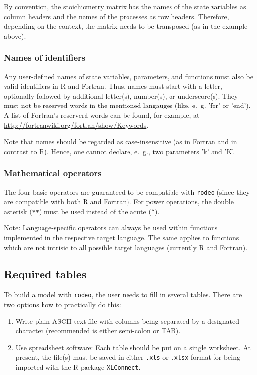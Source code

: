 \documentclass[a4paper]{article}
\newcommand{\rodeo}{\texttt{rodeo}}
\begin{document}
\bigskip
By convention, the stoichiometry matrix has the names of the state variables as column headers and the names of the processes as row headers. Therefore, depending on the context, the matrix needs to be transposed (as in the example above).

\subsubsection{Names of identifiers} \label{sec:input:conventions:names}
Any user-defined names of state variables, parameters, and functions must also be valid identifiers in R and Fortran. Thus, names must start with a letter, optionally followed by additional letter(s), number(s), or underscore(s). They must not be reserved words in the mentioned langauges (like, e.~g. 'for' or 'end'). A list of Fortran's reserverd words can be found, for example, at \url{http://fortranwiki.org/fortran/show/Keywords}.

Note that names should be regarded as case-insensitive (as in Fortran and in contrast to R). Hence, one cannot declare, e.~g., two parameters 'k' and 'K'.

\subsubsection{Mathematical operators} \label{sec:input:conventions:operators}
The four basic operators are guaranteed to be compatible with \rodeo{} (since they are compatible with both R and Fortran). For power operations, the double asterisk (\verb!**!) must be used instead of the acute (\verb!^!).

Note: Language-specific operators can always be used within functions implemented in the respective target language. The same applies to functions which are not intrisic to all possible target languages (currently R and Fortran).

\subsection{Required tables} \label{sec:input:tables}

To build a model with \rodeo{}, the user needs to fill in several tables. There are two options how to practically do this:
\begin{enumerate}
 \item Write plain ASCII text file with columns being separated by a designated character (recommended is either semi-colon or TAB). 
 \item Use spreadsheet software: Each table should be put on a single worksheet. At present, the file(s) must be saved in either \texttt{.xls} or \texttt{.xlsx} format for being imported with the R-package \texttt{XLConnect}.
\end{enumerate}
\end{document}
